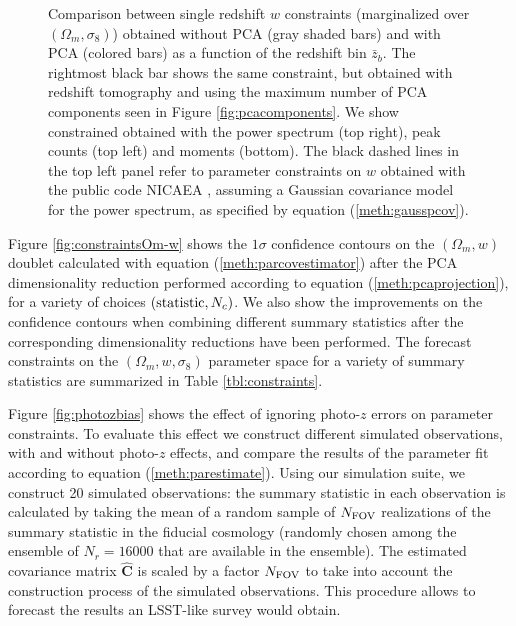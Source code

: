 \documentclass[reprint,aps,prd,superscriptaddress,showkeys,showpacs]{revtex4-1}
\newcommand{\bbh}[1]{\mathbf{\hat{#1}}}
\begin{document}
\begin{figure}
\caption{Comparison between single redshift $w$ constraints (marginalized over $(\Omega_m,\sigma_8)$) obtained without PCA (gray shaded bars) and with PCA (colored bars) as a function of the redshift bin $\bar{z}_b$. The rightmost black bar shows the same constraint, but obtained with redshift tomography and using the maximum number of PCA components seen in Figure \ref{fig:pcacomponents}. We show constrained obtained with the power spectrum (top right), peak counts (top left) and moments (bottom). The black dashed lines in the top left panel refer to parameter constraints on $w$ obtained with the public code NICAEA \citep{Nicaea}, assuming a Gaussian covariance model for the power spectrum, as specified by equation (\ref{meth:gausspcov}). }
\label{fig:nopca}
\end{figure}

Figure \ref{fig:constraintsOm-w} shows the $1\sigma$ confidence contours on the $(\Omega_m,w)$ doublet calculated with equation (\ref{meth:parcovestimator}) after the PCA dimensionality reduction performed according to equation (\ref{meth:pcaprojection}), for a variety of choices $({\rm statistic},N_c)$. We also show the improvements on the confidence contours when combining different summary statistics after the corresponding dimensionality reductions have been performed. The forecast constraints on the $(\Omega_m,w,\sigma_8)$ parameter space for a variety of summary statistics are summarized in Table \ref{tbl:constraints}. 

Figure \ref{fig:photozbias} shows the effect of ignoring photo-$z$ errors on parameter constraints. To evaluate this effect we construct different simulated observations, with and without photo-$z$ effects, and compare the results of the parameter fit according to equation (\ref{meth:parestimate}). Using our simulation suite, we construct 20 simulated observations: the summary statistic in each observation is calculated by taking the mean of a random sample of $N_{\rm FOV}$ realizations of the summary statistic in the fiducial cosmology (randomly chosen among the ensemble of $N_r=16000$ that are available in the ensemble). The estimated covariance matrix $\bbh{C}$ is scaled by a factor $N_{\rm FOV}$ to take into account the construction process of the simulated observations. This procedure allows to forecast the results an LSST-like survey would obtain.        
\end{document}
